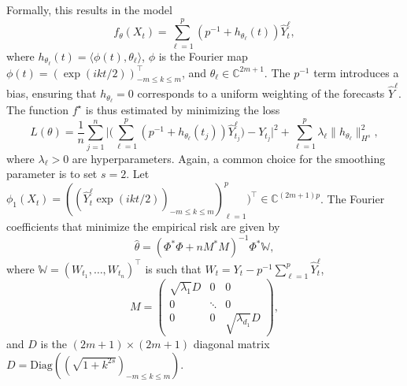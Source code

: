 Formally, this results in the model
\[f_\theta(X_t) = \sum_{\ell=1}^p (p^{-1}+ h_{\theta_\ell}(t) )\hat Y^\ell_{t},\]
where $h_{\theta_\ell}(t) = \langle \phi(t), \theta_\ell\rangle$, $\phi$ is the Fourier map $\phi(t) =(\exp(i k t/2))_{-m\leq k \leq m}^\top$, and $\theta_\ell \in \mathbb{C}^{2m+1}$.
The $p^{-1}$ term introduces a bias, ensuring that $h_{\theta_\ell} = 0$ corresponds to a uniform weighting of the forecasts $\hat Y^\ell$.
The function $f^\star$ is thus estimated by minimizing the loss
    \[L(\theta) = \frac{1}{n}\sum_{j=1}^n \Big|\Big(\sum_{\ell=1}^p (p^{-1}+ h_{\theta_\ell}(t_j) )\hat Y^\ell_{t_j}\Big) - Y_{t_j}\Big|^2  + \sum_{\ell=1}^{p} \lambda_\ell \|h_{\theta_\ell}\|_{H^s}^2,\]
    where $\lambda_\ell > 0$ are hyperparameters.
Again, a common choice for the smoothing parameter is to set $s = 2$. 
Let $\phi_1(X_t) = 
    (
    (\hat Y^\ell_{t}\exp(ik t/2))_{- m\leq k \leq  m})_{\ell=1}^p)^\top \in \mathbb C^{(2m+1)p}$.
The Fourier coefficients that minimize the empirical risk are given by
\[
\hat \theta  = ({\mathbb{\Phi}} ^\ast {\mathbb{\Phi}} + n M^\ast  M)^{-1}{\mathbb \Phi}^\ast   \mathbb W,
\]
where $\mathbb W = (W_{t_1}, \hdots, W_{t_n})^\top$ is such that $W_t = Y_t - p^{-1}\sum_{\ell=1}^p \hat Y^\ell_t$,
\[M = \begin{pmatrix}
        \sqrt{\lambda_1} D& 0  & 0\\
        0 & \ddots&  0\\
        0 & 0& \sqrt{\lambda_{d_1}} D
    \end{pmatrix},\]
and $D$ is the $(2m+1)\times (2m+1)$ diagonal matrix
$D =\mathrm{Diag}((\sqrt{1+k^{2s}})_{-m\leq k\leq m})$. 


